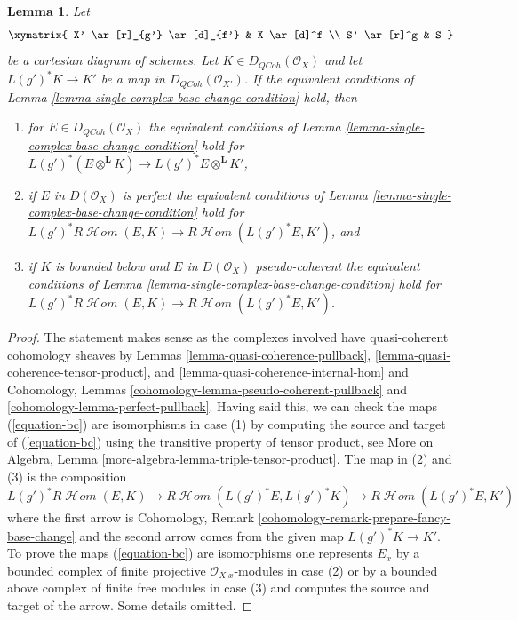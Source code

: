 \documentclass{stacks-project}
\theoremstyle{plain}
\newtheorem{lemma}[subsection]{Lemma}
\theoremstyle{definition}
\theoremstyle{remark}
\numberwithin{equation}{subsection}
\def\SheafHom{\mathop{\mathcal{H}\!\mathit{om}}\nolimits}
\def\QCoh{\mathit{QCoh}}
\begin{document}
\begin{lemma}
\label{lemma-single-complex-base-change-condition-inherited}
Let
$$
\xymatrix{
X' \ar[r]_{g'} \ar[d]_{f'} &
X \ar[d]^f \\
S' \ar[r]^g &
S
}
$$
be a cartesian diagram of schemes. Let $K \in D_\QCoh(\mathcal{O}_X)$
and let $L(g')^*K \to K'$ be a map in $D_\QCoh(\mathcal{O}_{X'})$.
If the equivalent conditions of
Lemma \ref{lemma-single-complex-base-change-condition} hold, then
\begin{enumerate}
\item for $E \in D_\QCoh(\mathcal{O}_X)$ the equivalent
conditions of Lemma \ref{lemma-single-complex-base-change-condition} hold
for $L(g')^*(E \otimes^\mathbf{L} K) \to L(g')^*E \otimes^\mathbf{L} K'$,
\item if $E$ in $D(\mathcal{O}_X)$ is perfect the equivalent conditions of
Lemma \ref{lemma-single-complex-base-change-condition} hold for
$L(g')^*R\SheafHom(E, K) \to R\SheafHom(L(g')^*E, K')$, and
\item if $K$ is bounded below and $E$ in $D(\mathcal{O}_X)$
pseudo-coherent the equivalent conditions of
Lemma \ref{lemma-single-complex-base-change-condition} hold for
$L(g')^*R\SheafHom(E, K) \to R\SheafHom(L(g')^*E, K')$.
\end{enumerate}
\end{lemma}

\begin{proof}
The statement makes sense as the complexes involved have quasi-coherent
cohomology sheaves by Lemmas
\ref{lemma-quasi-coherence-pullback},
\ref{lemma-quasi-coherence-tensor-product}, and
\ref{lemma-quasi-coherence-internal-hom} and
Cohomology, Lemmas \ref{cohomology-lemma-pseudo-coherent-pullback} and
\ref{cohomology-lemma-perfect-pullback}.
Having said this, we can check the maps (\ref{equation-bc})
are isomorphisms in case (1) by computing the source and target
of (\ref{equation-bc}) using the transitive property of tensor product, see
More on Algebra, Lemma \ref{more-algebra-lemma-triple-tensor-product}.
The map in (2) and (3) is the composition
$$
L(g')^*R\SheafHom(E, K) \to R\SheafHom(L(g')^*E, L(g')^*K)
\to R\SheafHom(L(g')^*E, K')
$$
where the first arrow is
Cohomology, Remark \ref{cohomology-remark-prepare-fancy-base-change}
and the second arrow comes from the given map $L(g')^*K \to K'$.
To prove the maps (\ref{equation-bc}) are isomorphisms one represents
$E_x$ by a bounded complex of finite projective $\mathcal{O}_{X. x}$-modules
in case (2) or by a bounded above complex of finite free modules in case (3)
and computes the source and target of the arrow.
Some details omitted.
\end{proof}
\end{document}
